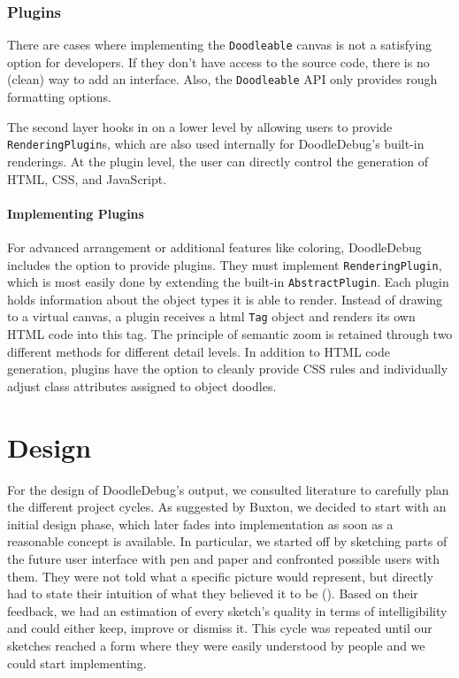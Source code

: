 \documentclass[english]{scrartcl}
\newcommand{\DD}{Dood\-le\-De\-bug\xspace}
\begin{document}
\subsubsection{Plugins}
There are cases where implementing the \texttt{Doodleable} canvas is not a satisfying option for developers.
If they don't have access to the source code, there is no (clean) way to add an interface.
Also, the \texttt{Doodleable} API only provides rough formatting options.

The second layer hooks in on a lower level by allowing users to provide \texttt{RenderingPlugin}s, which are also used internally for \DD's built-in renderings.
At the plugin level, the user can directly control the generation of HTML, CSS, and JavaScript.

\paragraph{Implementing Plugins}
For advanced arrangement or additional features like coloring, \DD includes the option to provide plugins.
They must implement \texttt{RenderingPlugin}, which is most easily done by extending the built-in \texttt{AbstractPlugin}.
Each plugin holds information about the object types it is able to render.
Instead of drawing to a virtual canvas, a plugin receives a html \texttt{Tag} object and renders its own HTML code into this tag.
The principle of semantic zoom is retained through two different methods for different detail levels.
In addition to HTML code generation, plugins have the option to cleanly provide CSS rules and individually adjust class attributes assigned to object doodles.


\section{Design}
For the design of \DD's output, we consulted literature to carefully plan the different project cycles.
As suggested by Buxton\cite[p. 73-76]{Buxt07a}, we decided to start with an initial design phase, which later fades into implementation as soon as a reasonable concept is available.
In particular, we started off by sketching parts of the future user interface with pen and paper and confronted possible users with them.
They were not told what a specific picture would represent, but directly had to state their intuition of what they believed it to be ().
Based on their feedback, we had an estimation of every sketch's quality in terms of intelligibility and could either keep, improve or dismiss it.
This cycle was repeated until our sketches reached a form where they were easily understood by people and we could start implementing.
\end{document}
